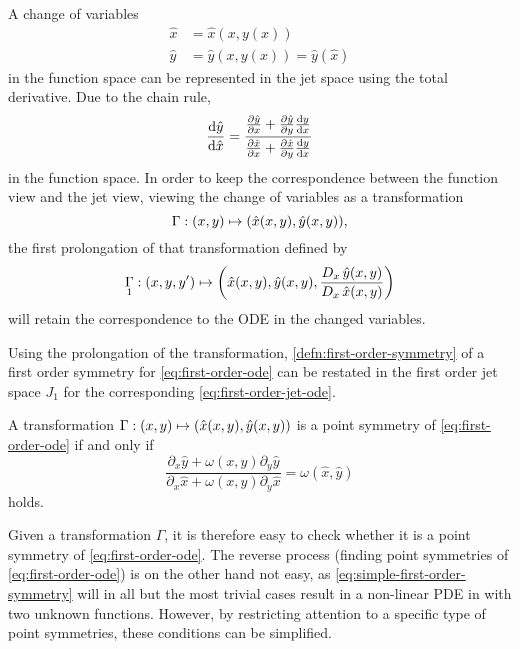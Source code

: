 A change of variables
\begin{align}
  \hat{x} &= \hat{x}(x, y(x))\\
  \hat{y} &= \hat{y}(x, y(x)) = \hat{y}(\hat{x})
\end{align}
in the function space can be represented in the jet space using the total derivative.
Due to the chain rule,
\begin{equation}
  \diff{\hat{y}}{\hat{x}} = 
  \frac{\diffp{\hat{y}}{x} + \diffp{\hat{y}}{y} \diff{y}{x}}{\diffp{\hat{x}}{x} + \diffp{\hat{x}}{y} \diff{y}{x}}
\end{equation}
in the function space.
In order to keep the correspondence between the function view and the jet view, viewing the change of variables as a transformation
\begin{equation}
  \Gamma: \pqty{x,y} \mapsto \pqty{\hat{x}(x,y), \hat{y}(x,y)},
\end{equation}
the first prolongation of that transformation defined by
\begin{equation}
  \prolong{\Gamma}{1}: \pqty{x,y,y'} \mapsto \pqty{\hat{x}(x,y), \hat{y}(x,y), \frac{\tD{x} \hat{y}(x,y)}{\tD{x} \hat{x}(x,y)}}
\end{equation}
will retain the correspondence to the ODE in the changed variables.

Using the prolongation of the transformation, \cref{defn:first-order-symmetry} of a first order symmetry for \cref{eq:first-order-ode} can be restated in the first order jet space \(J_1\) for the corresponding \cref{eq:first-order-jet-ode}.
\begin{lem} \label{lem:simple-first-order-symmetry}
  A transformation \(\Gamma: \pqty{x,y} \mapsto \pqty{\hat{x}(x,y), \hat{y}(x,y)}\) is a point symmetry of \cref{eq:first-order-ode} if and only if
  \begin{equation} \label{eq:simple-first-order-symmetry}
    \frac{\partial_x \hat{y} + \omega(x,y) \partial_y \hat{y}}{\partial_x \hat{x} + \omega(x,y) \partial_y \hat{x}} = \omega(\hat{x},\hat{y})
  \end{equation}
  holds.
\end{lem} %
Given a transformation \(\Gamma\), it is therefore easy to check whether it is a point symmetry of \cref{eq:first-order-ode}.
The reverse process (finding point symmetries of \cref{eq:first-order-ode}) is on the other hand not easy, as \cref{eq:simple-first-order-symmetry} will in all but the most trivial cases result in a non-linear PDE in with two unknown functions.
However, by restricting attention to a specific type of point symmetries, these conditions can be simplified.

